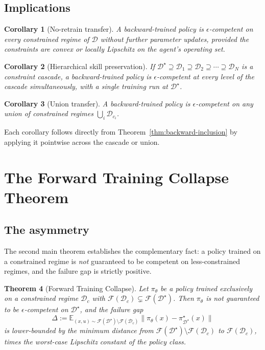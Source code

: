 \documentclass[twocolumn,11pt,a4paper]{article}
\newtheorem{theorem}{Theorem}[section]
\newtheorem{corollary}[theorem]{Corollary}
\newcommand{\cD}{\mathcal{D}}
\newcommand{\cF}{\mathcal{F}}
\newcommand{\E}{\mathbb{E}}
\begin{document}
\subsection{Implications}

\begin{corollary}[No-retrain transfer]
\label{cor:no-retrain}
A backward-trained policy is $\epsilon$-competent on every constrained regime of $\cD$ without further parameter updates, provided the constraints are convex or locally Lipschitz on the agent's operating set.
\end{corollary}

\begin{corollary}[Hierarchical skill preservation]
\label{cor:hierarchy}
If $\cD^\star \supseteq \cD_1 \supseteq \cD_2 \supseteq \cdots \supseteq \cD_N$ is a constraint cascade, a backward-trained policy is $\epsilon$-competent at every level of the cascade simultaneously, with a single training run at $\cD^\star$.
\end{corollary}

\begin{corollary}[Union transfer]
\label{cor:union-transfer}
A backward-trained policy is $\epsilon$-competent on any union of constrained regimes $\bigcup_i \cD_{c_i}$.
\end{corollary}

Each corollary follows directly from Theorem~\ref{thm:backward-inclusion} by applying it pointwise across the cascade or union.


\section{The Forward Training Collapse Theorem}
\label{sec:collapse}

\subsection{The asymmetry}

The second main theorem establishes the complementary fact: a policy trained on a constrained regime is \emph{not} guaranteed to be competent on less-constrained regimes, and the failure gap is strictly positive.

\begin{theorem}[Forward Training Collapse]
\label{thm:collapse}
Let $\pi_\theta$ be a policy trained exclusively on a constrained regime $\cD_c$ with $\cF(\cD_c) \subsetneq \cF(\cD^\star)$. Then $\pi_\theta$ is not guaranteed to be $\epsilon$-competent on $\cD^\star$, and the failure gap
\begin{equation}
\Delta := \E_{(x, u) \sim \cF(\cD^\star) \setminus \cF(\cD_c)} \|\pi_\theta(x) - \pi^\star_{\cD^\star}(x)\|
\end{equation}
is lower-bounded by the minimum distance from $\cF(\cD^\star) \setminus \cF(\cD_c)$ to $\cF(\cD_c)$, times the worst-case Lipschitz constant of the policy class.
\end{theorem}
\end{document}
